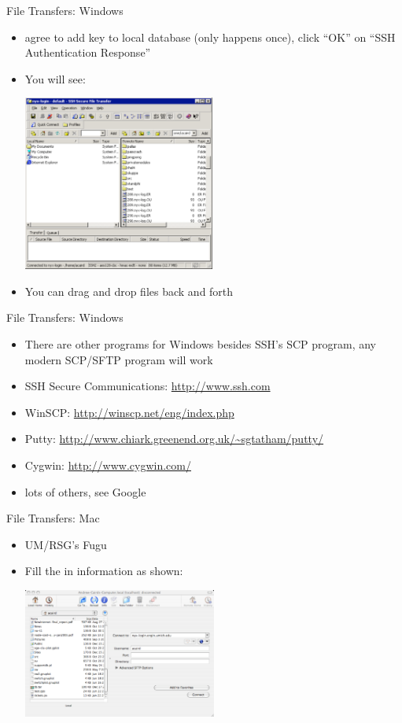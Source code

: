 \documentclass{beamer}
\begin{document}
  \begin{frame}{File Transfers: Windows}
    \begin{itemize}
    \item agree to add key to local database (only happens once), click
      ``OK'' on ``SSH Authentication Response''
    \item You will see: \\
      \begin{center}\includegraphics[width=2.48in]{ssh-sftp-connected}\end{center}
    \item You can drag and drop files back and forth
    \end{itemize}
  \end{frame}
  \begin{frame}{File Transfers: Windows}
    \begin{itemize}
    \item There are other programs for Windows besides SSH's SCP
      program, any modern SCP/SFTP program will work
    \item SSH Secure Communications: \url{http://www.ssh.com}
    \item WinSCP: \url{http://winscp.net/eng/index.php}
    \item Putty: \url{http://www.chiark.greenend.org.uk/~sgtatham/putty/}
    \item Cygwin: \url{http://www.cygwin.com/}
    \item lots of others, see Google
    \end{itemize}
  \end{frame}
  \begin{frame}{File Transfers: Mac}
    \begin{itemize}
    \item UM/RSG's Fugu
    \item Fill the in information as shown: \\
      \begin{center}\includegraphics[width=2.5in]{ssh-fugu-login}\end{center}
    \end{itemize}
  \end{frame}
\end{document}
